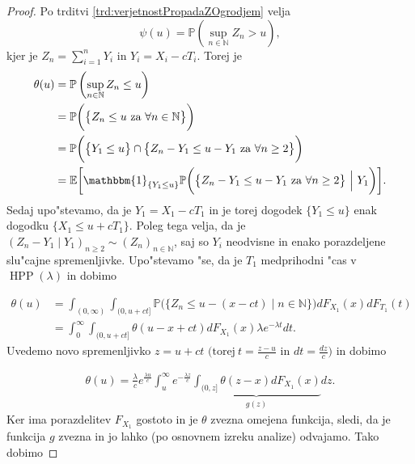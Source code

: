 \documentclass[12pt, a4paper, reqno]{amsart}
\theoremstyle{definition}
\theoremstyle{plain}
\newcommand{\N}{\mathbb{N}}
\newcommand{\E}{\mathbb{E}}
\newcommand{\Prob}{\mathbb{P}}
\newcommand{\1}{\mathds{1}}
\DeclareMathOperator{\HPP}{HPP}
\begin{document}
    \begin{proof}
        Po trditvi \ref{trd:verjetnostPropadaZOgrodjem} velja
        \begin{equation*}
            \psi(u) = \Prob\left(\sup_{n\in\N}Z_n > u\right),
        \end{equation*}
        kjer je $Z_n = \sum_{i=1}^nY_i$ in $Y_i = X_i - cT_i$. Torej je
        \begin{align*}
            \theta(u) &= \Prob\left(\sup_{n\in\N}Z_n \leq u\right) \\
                      &= \Prob\biggl(\bigl\{Z_n \leq u \ \text{za} \ \forall n\in\N\bigr\}\biggr) \\
                      &= \Prob\biggl(\bigl\{Y_1 \leq u\bigr\}\cap \bigl\{Z_n - Y_1 \leq u - Y_1 \ \text{za} \ \forall n\geq2\bigr\}\biggr) \\
                      &= \E\biggl[\mathbbm{1}_{\{Y_1\leq u\}}\Prob\biggl(\bigl\{Z_n - Y_1 \leq u - Y_1 \ \text{za} \ \forall n\geq2\bigr\} \ \Big| \ Y_1\biggr)\biggr].
        \end{align*}
        Sedaj upo"stevamo, da je $Y_1 = X_1 - cT_1$ in je torej dogodek $\{Y_1 \leq u\}$ 
        enak dogodku $\{X_1 \leq u + cT_1\}$. Poleg tega velja, da je 
        $(Z_n - Y_1\mid Y_1)_{n\geq2} \sim (Z_n)_{n\in\N}$, saj so $Y_i$ neodvisne in enako porazdeljene
        slu"cajne spremenljivke.
        Upo"stevamo "se, da je  $T_1$ medprihodni "cas v $\HPP(\lambda)$ in dobimo

        \begin{align*}
                \theta(u)   &= \int_{(0, \infty)}\int_{(0, u + ct]}\Prob\biggl(\bigl\{Z_n \leq u - (x - ct)\mid n\in\N\bigr\}\biggr)dF_{X_1}(x)dF_{T_1}(t) \\
                            &= \int_0^\infty\int_{(0, u + ct]}\theta(u - x + ct)dF_{X_1}(x)\lambda e^{-\lambda t}dt.
        \end{align*}
        Uvedemo novo spremenljivko $z = u + ct$ $\bigl( \text{torej} \ t = \tfrac{z - u}{c}$ in $dt = \tfrac{dz}{c} \bigr)$ 
        in dobimo

        \begin{align*}
                    \theta(u) = \frac{\lambda}{c}e^{\frac{\lambda u}{c}}\int_u^\infty e^{-\frac{\lambda z}{c}}\underbrace{\int_{(0, z]}\theta(z - x)dF_{X_1}(x)}_{g(z)}dz.
        \end{align*}
        Ker ima porazdelitev $F_{X_1}$ gostoto in je $\theta$ zvezna omejena funkcija,
        sledi, da je funkcija $g$ zvezna in jo lahko (po osnovnem izreku analize)
        odvajamo. Tako dobimo


\end{proof}
\end{document}
